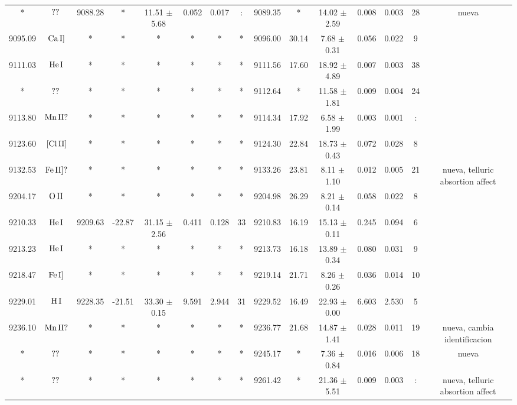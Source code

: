 \documentclass{article}
\begin{document}
\begin{table*}
\begin{adjustbox}{width=\textwidth}
\begin{tabular}{ccccccccccccccc}
* & $\mbox{??}\thinspace \mbox{}$ & 9088.28 & * & 11.51 $\pm$ 5.68 & 0.052 & 0.017 & : & 9089.35 & * & 14.02 $\pm$ 2.59 & 0.008 & 0.003 & 28 &  nueva \\
9095.09 & $\mbox{Ca}\thinspace \mbox{I]}$ & * & * & * & * & * & * & 9096.00 & 30.14 & 7.68 $\pm$ 0.31 & 0.056 & 0.022 & 9 &  \\
9111.03 & $\mbox{He}\thinspace \mbox{I}$ & * & * & * & * & * & * & 9111.56 & 17.60 & 18.92 $\pm$ 4.89 & 0.007 & 0.003 & 38 &  \\
* & $\mbox{??}\thinspace \mbox{}$ & * & * & * & * & * & * & 9112.64 & * & 11.58 $\pm$ 1.81 & 0.009 & 0.004 & 24 &  \\
9113.80 & $\mbox{Mn}\thinspace \mbox{II?}$ & * & * & * & * & * & * & 9114.34 & 17.92 & 6.58 $\pm$ 1.99 & 0.003 & 0.001 & : &  \\
9123.60 & $\mbox{[Cl}\thinspace \mbox{II]}$ & * & * & * & * & * & * & 9124.30 & 22.84 & 18.73 $\pm$ 0.43 & 0.072 & 0.028 & 8 &  \\
9132.53 & $\mbox{Fe}\thinspace \mbox{II]?}$ & * & * & * & * & * & * & 9133.26 & 23.81 & 8.11 $\pm$ 1.10 & 0.012 & 0.005 & 21 &  nueva, telluric absortion affect \\
9204.17 & $\mbox{O}\thinspace \mbox{II}$ & * & * & * & * & * & * & 9204.98 & 26.29 & 8.21 $\pm$ 0.14 & 0.058 & 0.022 & 8 &  \\
9210.33 & $\mbox{He}\thinspace \mbox{I}$ & 9209.63 & -22.87 & 31.15 $\pm$ 2.56 & 0.411 & 0.128 & 33 & 9210.83 & 16.19 & 15.13 $\pm$ 0.11 & 0.245 & 0.094 & 6 &  \\
9213.23 & $\mbox{He}\thinspace \mbox{I}$ & * & * & * & * & * & * & 9213.73 & 16.18 & 13.89 $\pm$ 0.34 & 0.080 & 0.031 & 9 &  \\
9218.47 & $\mbox{Fe}\thinspace \mbox{I]}$ & * & * & * & * & * & * & 9219.14 & 21.71 & 8.26 $\pm$ 0.26 & 0.036 & 0.014 & 10 &  \\
9229.01 & $\mbox{H}\thinspace \mbox{I}$ & 9228.35 & -21.51 & 33.30 $\pm$ 0.15 & 9.591 & 2.944 & 31 & 9229.52 & 16.49 & 22.93 $\pm$ 0.00 & 6.603 & 2.530 & 5 &  \\
9236.10 & $\mbox{Mn}\thinspace \mbox{II?}$ & * & * & * & * & * & * & 9236.77 & 21.68 & 14.87 $\pm$ 1.41 & 0.028 & 0.011 & 19 &  nueva, cambia identificacion \\
* & $\mbox{??}\thinspace \mbox{}$ & * & * & * & * & * & * & 9245.17 & * & 7.36 $\pm$ 0.84 & 0.016 & 0.006 & 18 &  nueva \\
* & $\mbox{??}\thinspace \mbox{}$ & * & * & * & * & * & * & 9261.42 & * & 21.36 $\pm$ 5.51 & 0.009 & 0.003 & : &  nueva, telluric absortion affect \\

\end{tabular}
\end{adjustbox}
\end{table*}
\end{document}
